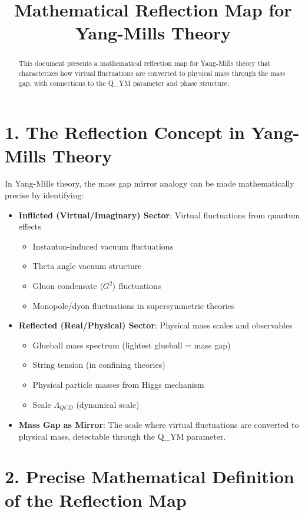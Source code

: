 \documentclass[11pt]{article}
\title{Mathematical Reflection Map for Yang-Mills Theory}
\author{}
\date{}
\begin{document}
\maketitle
\begin{abstract}
This document presents a mathematical reflection map for Yang-Mills theory that characterizes how virtual fluctuations are converted to physical mass through the mass gap, with connections to the Q_YM parameter and phase structure.
\end{abstract}

\section{1. The Reflection Concept in Yang-Mills Theory}

In Yang-Mills theory, the mass gap mirror analogy can be made mathematically precise by identifying:

\begin{itemize}
\item \textbf{Inflicted (Virtual/Imaginary) Sector}: Virtual fluctuations from quantum effects
  \begin{itemize}
  \item Instanton-induced vacuum fluctuations
  \item Theta angle vacuum structure
  \item Gluon condensate $\langle G^2\rangle$ fluctuations
  \item Monopole/dyon fluctuations in supersymmetric theories
  \end{itemize}
\item \textbf{Reflected (Real/Physical) Sector}: Physical mass scales and observables
  \begin{itemize}
  \item Glueball mass spectrum (lightest glueball = mass gap)
  \item String tension (in confining theories)
  \item Physical particle masses from Higgs mechanism
  \item Scale $\Lambda_{QCD}$ (dynamical scale)
  \end{itemize}
\item \textbf{Mass Gap as Mirror}: The scale where virtual fluctuations are converted to physical mass, detectable through the Q_YM parameter.
\end{itemize}

\section{2. Precise Mathematical Definition of the Reflection Map}
\end{document}
